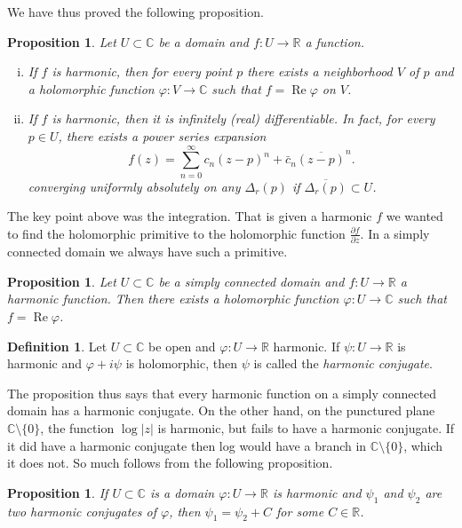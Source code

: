 \documentclass[12pt,openany]{book}
\renewcommand{\Re}{\operatorname{Re}}
\newcommand{\sabs}[1]{\lvert {#1} \rvert}
\newcommand{\C}{{\mathbb{C}}}
\newcommand{\R}{{\mathbb{R}}}
\newcommand{\myindex}[1]{#1\index{#1}}
\theoremstyle{plain}
\newtheorem{prop}[thm]{Proposition}
\theoremstyle{remark}
\theoremstyle{definition}
\newtheorem{defn}[thm]{Definition}
\theoremstyle{exercise}
\theoremstyle{example}
\begin{document}
We have thus proved the following proposition.

\begin{prop}
Let $U \subset \C$ be a domain and $f \colon U \to \R$ a function.
\begin{enumerate}[(i)]
\item
If $f$ is harmonic,
then for every point $p$ there exists a neighborhood $V$ of $p$ and a
holomorphic function $\varphi \colon V \to \C$ such that $f = \Re \varphi$
on $V$.
\item
If $f$ is harmonic, then it is infinitely (real) differentiable.  In fact,
for every $p \in U$, there exists a power series expansion
\begin{equation*}
f(z) =
\sum_{n=0}^\infty c_n {(z-p)}^n + \bar{c}_n {\overline{(z-p)}}^n .
\end{equation*}
converging uniformly absolutely
on any $\Delta_r(p)$ if $\overline{\Delta_r(p)} \subset U$.
\end{enumerate}
\end{prop}

The key point above was the integration.  That is given a harmonic $f$ we wanted to
find the holomorphic primitive to the holomorphic function
$\frac{\partial f}{\partial z}$.  In a simply connected domain we always
have such a primitive.

\begin{prop}
Let $U \subset \C$ be a simply connected domain and $f \colon U \to \R$ a
harmonic function.  Then there exists a holomorphic function $\varphi \colon
U \to \C$ such that $f = \Re \varphi$.
\end{prop}

\begin{defn}
Let $U \subset \C$ be open and $\varphi \colon U \to \R$ harmonic.
If $\psi \colon U \to \R$ is harmonic and $\varphi + i \psi$ is holomorphic,
then $\psi$ is called the \emph{\myindex{harmonic conjugate}}.
\end{defn}

The proposition thus says that every harmonic function on a simply connected
domain has a harmonic conjugate.  On the other hand, on the punctured plane
$\C \setminus \{ 0 \}$, the function $\log \sabs{z}$ is harmonic, but
fails to have a harmonic conjugate.  If it did have a harmonic conjugate
then log would have a branch in $\C \setminus \{0\}$, which it does not.
So much follows from the following proposition.


\begin{prop}
If $U \subset \C$ is a domain $\varphi \colon U \to \R$ is harmonic
and $\psi_1$ and $\psi_2$ are two harmonic conjugates of $\varphi$,
then $\psi_1 = \psi_2 + C$ for some $C \in \R$.
\end{prop}
\end{document}
